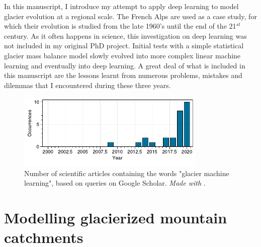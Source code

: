 In this manuscript, I introduce my attempt to apply deep learning to model glacier evolution at a regional scale. The French Alps are used as a case study, for which their evolution is studied from the late 1960's until the end of the 21$^{st}$ century. As it often happens in science, this investigation on deep learning was not included in my original PhD project. Initial tests with a simple statistical glacier mass balance model slowly evolved into more complex linear machine learning and eventually into deep learning. A great deal of what is included in this manuscript are the lessons learnt from numerous problems, mistakes and dilemmas that I encountered during these three years. 

\begin{figure}[h]
\centering
\includegraphics[width=9cm]{Figures/intro/Figure_4.pdf}
\caption{Number of scientific articles containing the words "glacier machine learning", based on queries on Google Scholar. \textit{Made with} \citet{strobel_pold87academic-keyword-occurrence_2018}.}
\label{intro:fig4}
\end{figure} 

\section{Modelling glacierized mountain catchments}

